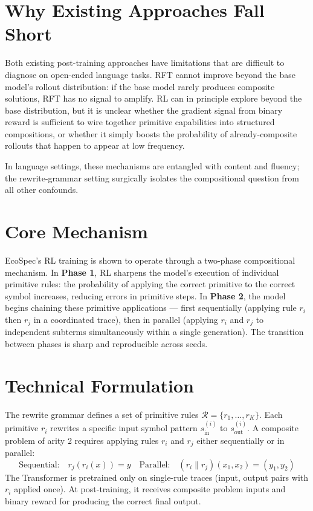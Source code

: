 \documentclass[10pt,twocolumn]{article}
\begin{document}
\section{Why Existing Approaches Fall Short}

Both existing post-training approaches have limitations that are
difficult to diagnose on open-ended language tasks.
RFT cannot improve beyond the base model's rollout distribution:
if the base model rarely produces composite solutions, RFT has
no signal to amplify.
RL can in principle explore beyond the base distribution, but
it is unclear whether the gradient signal from binary reward is
sufficient to wire together primitive capabilities into structured
compositions, or whether it simply boosts the probability of
already-composite rollouts that happen to appear at low frequency.

In language settings, these mechanisms are entangled with content
and fluency; the rewrite-grammar setting surgically isolates
the compositional question from all other confounds.

\section{Core Mechanism}

EcoSpec's RL training is shown to operate through a two-phase
compositional mechanism.
In \textbf{Phase 1}, RL sharpens the model's execution of individual
primitive rules: the probability of applying the correct primitive
to the correct symbol increases, reducing errors in primitive steps.
In \textbf{Phase 2}, the model begins chaining these primitive
applications --- first sequentially (applying rule $r_i$ then $r_j$
in a coordinated trace), then in parallel (applying $r_i$ and $r_j$
to independent subterms simultaneously within a single generation).
The transition between phases is sharp and reproducible across seeds.

\section{Technical Formulation}

The rewrite grammar defines a set of primitive rules
$\mathcal{R} = \{r_1, \ldots, r_K\}$.
Each primitive $r_i$ rewrites a specific input symbol pattern
$s_{\text{in}}^{(i)}$ to $s_{\text{out}}^{(i)}$.
A composite problem of arity 2 requires applying rules
$r_i$ and $r_j$ either sequentially or in parallel:
\[
\text{Sequential:}\quad r_j(r_i(x)) = y
\quad
\text{Parallel:}\quad (r_i \!\parallel\! r_j)(x_1, x_2) = (y_1, y_2)
\]
The Transformer is pretrained only on single-rule traces (input, output
pairs with $r_i$ applied once). At post-training, it receives composite
problem inputs and binary reward for producing the correct final output.
\end{document}
